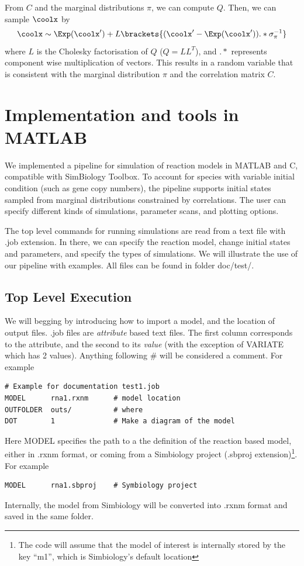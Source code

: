 \documentclass[letterpaper]{article}
\begin{document}
From $C$ and the marginal distributions $\pi$, we can compute
$Q$. Then, we can sample $\coolx$ by
$$\coolx \sim \Exp(\coolx^\prime) + L\brackets{(\coolx^\prime-\Exp(\coolx^\prime)).*\sigma_\pi^{-1}}$$
where $L$ is the Cholesky factorisation of $Q$ ($Q=LL^T$), and
$.*$ represents component wise multiplication of vectors. This results
in a random variable that is consistent with the marginal distribution
$\pi$ and the correlation matrix $C$.

\section{Implementation and tools in MATLAB}

We implemented a pipeline for simulation of reaction models in MATLAB
and C, compatible with SimBiology Toolbox. To account for species with
variable initial condition (such as gene copy numbers), the pipeline
supports initial states sampled from marginal distributions
constrained by correlations. The user can specify different kinds of
simulations, parameter scans, and plotting options.

The top level commands for running simulations are read from a text
file with \textsf{.job} extension. In there, we can specify the
reaction model, change initial states and parameters, and specify the
types of simulations. We will illustrate the use of our pipeline with
examples. All files can be found in folder \textsf{doc/test/}.

\subsection{Top Level Execution}

We will begging by introducing how to import a model, and the location
of output files. \textsf{.job} files are \emph{attribute} based text
files. The first column corresponds to the attribute, and the second
to its \emph{value} (with the exception of VARIATE which has 2
values). Anything following \# will be considered a comment. For
example
{\footnotesize
\begin{verbatim}
# Example for documentation test1.job
MODEL      rna1.rxnm      # model location
OUTFOLDER  outs/          # where 
DOT        1              # Make a diagram of the model
\end{verbatim}
}
Here MODEL specifies the path to a the definition of the reaction
based model, either in \textsf{.rxnm} format, or coming from a
Simbiology project (\textsf{.sbproj} extension)\footnote{The code will
  assume that the model of interest is internally stored by the key
  ``m1'', which is Simbiology's default location}. For example
{\footnotesize
\begin{verbatim}
MODEL      rna1.sbproj    # Symbiology project
\end{verbatim}
}
Internally, the model from Simbiology will be converted into
\textsf{.rxnm} format and saved in the same folder.
\end{document}
